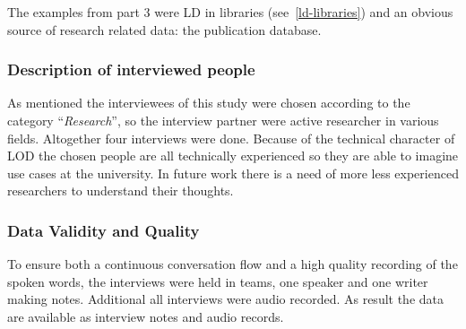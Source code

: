 The examples from part 3 were LD in libraries (see~\ref{ld-libraries}) and an obvious source of research related data: the publication database.

\subsubsection{Description of interviewed people}
As mentioned the interviewees of this study were chosen according to the category "`\textit{Research}"', so the interview partner were active researcher in various fields. Altogether four interviews were done. Because of the technical character of LOD the chosen people are all technically experienced so they are able to imagine use cases at the university. In future work there is a need of more less experienced researchers to understand their thoughts.

\subsubsection{Data Validity and Quality}
To ensure both a continuous conversation flow and a high quality recording of the spoken words, the interviews were held in teams, one speaker and one writer making notes. Additional all interviews were audio recorded.
As result the data are available as interview notes and audio records.